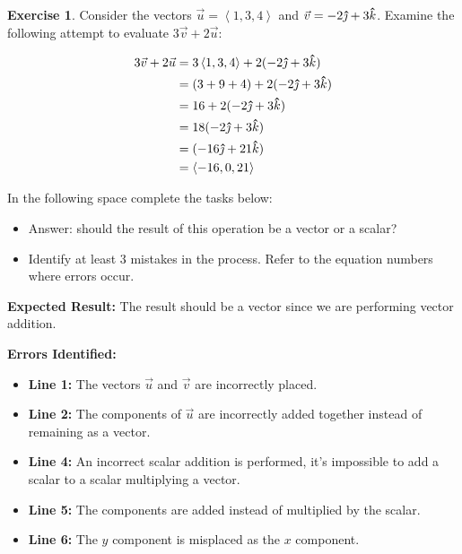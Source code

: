 \documentclass[12pt]{article}
\theoremstyle{plain}
\theoremstyle{definition}
\newtheorem{Ej}[Th]{Exercise}         %
\theoremstyle{remark}
\newcommand{\thickhat}[1]{\mathbf{\hat{\text{$#1$}}}}
\newcommand{\jj}{\vu{\jmath}}
\newcommand{\kk}{\thickhat{k}}
\renewcommand{\:}{\colon}           %
\renewcommand{\.}{\Cdot}                %
\newcommand{\br}[1]{\left\langle #1\right\rangle}
\begin{document}

  \begin{Ej}
    Consider the vectors $\vec{u} = \br{1, 3, 4}$ and $\vec{v} = -2\jj + 3\kk$. Examine the following attempt to evaluate $3\vec{v} + 2\vec{u}$:
    \begin{ptcb}
    \begin{align}
        3\vec{v} + 2\vec{u} &= 3\br{1, 3, 4} + 2(-2\jj + 3\kk) \\
        &= (3 + 9 + 4) + 2(-2\jj + 3\kk) \\
        &= 16 + 2(-2\jj + 3\kk) \\
        &= 18(-2\jj + 3\kk) \\
        &= (-16\jj + 21\kk) \\
        &= \br{-16, 0, 21}
      \end{align}
    \end{ptcb}
    
    In the following space complete the tasks below:
    \begin{itemize}
      \item Answer: should the result of this operation be a vector or a scalar?
      \item Identify at least 3 mistakes in the process. Refer to the equation numbers where errors occur.
    \end{itemize}
  \end{Ej}
  
  \begin{ptcb}
    \textbf{Expected Result:} The result should be a vector since we are performing vector addition.
  
    \textbf{Errors Identified:}
    \begin{itemize}
      \item \textbf{Line 1:} The vectors $\vec{u}$ and $\vec{v}$ are incorrectly placed.
      \item \textbf{Line 2:} The components of $\vec{u}$ are incorrectly added together instead of remaining as a vector.
      \item \textbf{Line 4:} An incorrect scalar addition is performed, it's impossible to add a scalar to a scalar multiplying a vector.
      \item \textbf{Line 5:} The components are added instead of multiplied by the scalar.
      \item \textbf{Line 6:} The $y$ component is misplaced as the $x$ component.
    \end{itemize}
  \end{ptcb}
  
\end{document}
